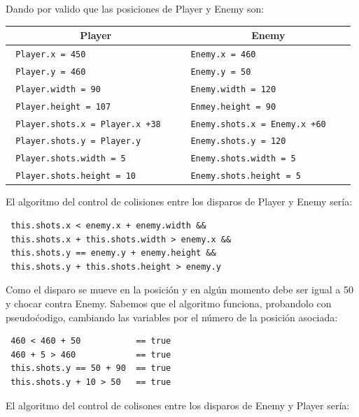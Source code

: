 \documentclass[a4paper,10pt]{article}
\begin{document}
Dando por valido que las posiciones de Player y Enemy son:

\begin{center}
 \begin{tabular}{cc}
 \hline
  Player & Enemy\\
  \hline
  \verb| Player.x = 450                   | & \verb|Enemy.x = 460                  |\\
  \verb| Player.y = 460                   | & \verb|Enemy.y = 50                   |\\
  \verb| Player.width = 90                | & \verb|Enemy.width = 120              |\\
  \verb| Player.height = 107              | & \verb|Enmey.height = 90              |\\
  \verb| Player.shots.x = Player.x +38    | & \verb|Enemy.shots.x = Enemy.x +60    |\\
  \verb| Player.shots.y = Player.y        | & \verb|Enemy.shots.y = 120            |\\
  \verb| Player.shots.width = 5           | & \verb|Enemy.shots.width = 5          |\\
  \verb| Player.shots.height = 10         | & \verb|Enemy.shots.height = 5         |\\
 \hline
 \end{tabular}
\end{center}

El algoritmo del control de colisiones entre los disparos de Player y Enemy sería:

\begin{verbatim}
 this.shots.x < enemy.x + enemy.width &&
 this.shots.x + this.shots.width > enemy.x &&
 this.shots.y == enemy.y + enemy.height &&
 this.shots.y + this.shots.height > enemy.y
\end{verbatim}

Como el disparo se mueve en la posición y en algún momento debe ser igual a 50 y chocar contra Enemy.
Sabemos que el algoritmo funciona, probandolo con pseudoćodigo, 
cambiando las variables por el número de la posición asociada:

\begin{verbatim}
 460 < 460 + 50           == true
 460 + 5 > 460            == true
 this.shots.y == 50 + 90  == true
 this.shots.y + 10 > 50   == true
\end{verbatim}
\cleardoublepage


El algoritmo del control de colisones entre los disparos de Enemy y Player sería:
\end{document}
